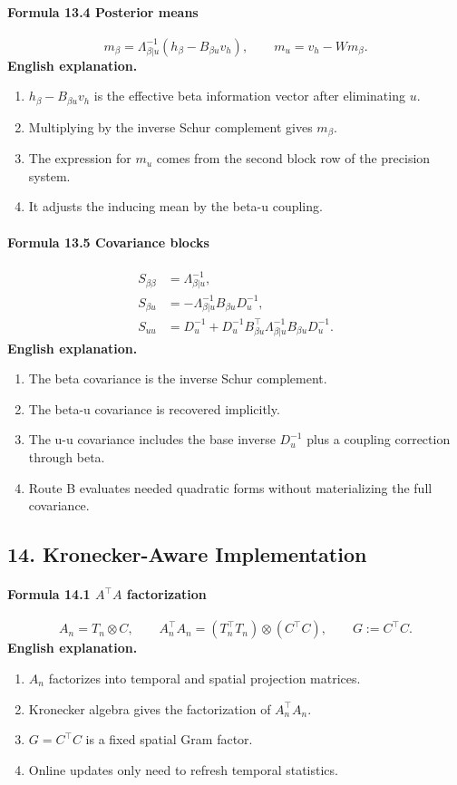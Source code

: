 \documentclass[12pt]{article}
\begin{document}
\paragraph{Formula 13.4 Posterior means}
\[
m_\beta=
\Lambda_{\beta|u}^{-1}(h_\beta-B_{\beta u}v_h),
\qquad
m_u=v_h-Wm_\beta.
\]
\textbf{English explanation.}
\begin{enumerate}[leftmargin=2em]
\item \(h_\beta-B_{\beta u}v_h\) is the effective beta information vector after eliminating \(u\).
\item Multiplying by the inverse Schur complement gives \(m_\beta\).
\item The expression for \(m_u\) comes from the second block row of the precision system.
\item It adjusts the inducing mean by the beta-u coupling.
\end{enumerate}

\paragraph{Formula 13.5 Covariance blocks}
\[
\begin{aligned}
S_{\beta\beta}&=\Lambda_{\beta|u}^{-1},\\
S_{\beta u}&=-\Lambda_{\beta|u}^{-1}B_{\beta u}D_u^{-1},\\
S_{uu}&=D_u^{-1}+D_u^{-1}B_{\beta u}^\top
\Lambda_{\beta|u}^{-1}B_{\beta u}D_u^{-1}.
\end{aligned}
\]
\textbf{English explanation.}
\begin{enumerate}[leftmargin=2em]
\item The beta covariance is the inverse Schur complement.
\item The beta-u covariance is recovered implicitly.
\item The u-u covariance includes the base inverse \(D_u^{-1}\) plus a coupling correction through beta.
\item Route B evaluates needed quadratic forms without materializing the full covariance.
\end{enumerate}

\subsection{14. Kronecker-Aware Implementation}
\paragraph{Formula 14.1 \(A^\top A\) factorization}
\[
A_n=T_n\otimes C,
\qquad
A_n^\top A_n=(T_n^\top T_n)\otimes(C^\top C),
\qquad
G:=C^\top C.
\]
\textbf{English explanation.}
\begin{enumerate}[leftmargin=2em]
\item \(A_n\) factorizes into temporal and spatial projection matrices.
\item Kronecker algebra gives the factorization of \(A_n^\top A_n\).
\item \(G=C^\top C\) is a fixed spatial Gram factor.
\item Online updates only need to refresh temporal statistics.
\end{enumerate}
\end{document}
